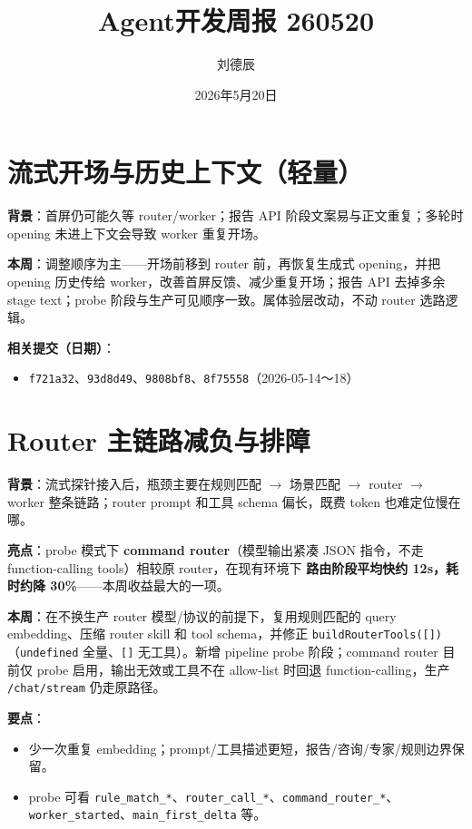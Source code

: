 \documentclass[UTF8]{ctexart}
\title{Agent开发周报 260520}
\author{刘德辰}
\date{2026年5月20日}
\begin{document}
\maketitle

\section{流式开场与历史上下文（轻量）}

\textbf{背景}：首屏仍可能久等 router/worker；报告 API 阶段文案易与正文重复；多轮时 opening 未进上下文会导致 worker 重复开场。

\textbf{本周}：调整顺序为主——开场前移到 router 前，再恢复生成式 opening，并把 opening 历史传给 worker，改善首屏反馈、减少重复开场；报告 API 去掉多余 stage text；probe 阶段与生产可见顺序一致。属体验层改动，不动 router 选路逻辑。

\textbf{相关提交（日期）}：
\begin{itemize}
\item \texttt{f721a32}、\texttt{93d8d49}、\texttt{9808bf8}、\texttt{8f75558}（2026-05-14～18）
\end{itemize}

\section{Router 主链路减负与排障}

\textbf{背景}：流式探针接入后，瓶颈主要在规则匹配 $\rightarrow$ 场景匹配 $\rightarrow$ router $\rightarrow$ worker 整条链路；router prompt 和工具 schema 偏长，既费 token 也难定位慢在哪。

\textbf{亮点}：probe 模式下 \textbf{command router}（模型输出紧凑 JSON 指令，不走 function-calling tools）相较原 router，在现有环境下 \textbf{路由阶段平均快约 12s，耗时约降 30\%}——本周收益最大的一项。

\textbf{本周}：在不换生产 router 模型/协议的前提下，复用规则匹配的 query embedding、压缩 router skill 和 tool schema，并修正 \texttt{buildRouterTools([])}（\texttt{undefined} 全量、\texttt{[]} 无工具）。新增 pipeline probe 阶段；command router 目前仅 probe 启用，输出无效或工具不在 allow-list 时回退 function-calling，生产 \texttt{/chat/stream} 仍走原路径。

\textbf{要点}：
\begin{itemize}
\item 少一次重复 embedding；prompt/工具描述更短，报告/咨询/专家/规则边界保留。
\item probe 可看 \texttt{rule\_match\_*}、\texttt{router\_call\_*}、\texttt{command\_router\_*}、\texttt{worker\_started}、\texttt{main\_first\_delta} 等。
\end{itemize}
\end{document}

